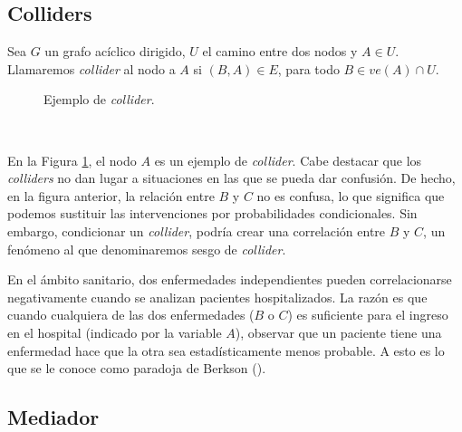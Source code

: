 \documentclass[oneside,openright,titlepage,numbers=noenddot,openany,headinclude,footinclude=true,
cleardoublepage=empty,abstractoff,BCOR=5mm,paper=a4,fontsize=12pt,main=spanish]{scrreprt}
\begin{document}
\subsection{Colliders}

\begin{definition} 
Sea $G$ un grafo acíclico dirigido, $U$ el camino entre dos nodos y $A\in U$. Llamaremos \textit{collider} al nodo a $A$ si $(B,A)\in E$, para todo $B\in ve(A) \cap U$.
\end{definition}

\begin{figure}[h]
\centering
{}
\caption{Ejemplo de \textit{collider}.}
\label{fig:collider}
\end{figure}\

En la Figura \ref{fig:collider}, el nodo $A$ es un ejemplo de \textit{collider}. Cabe destacar que los \textit{colliders} no dan lugar a situaciones en las que se pueda dar confusión. De hecho, en la figura anterior, la relación entre $B$ y $C$ no es confusa, lo que significa que podemos sustituir las intervenciones por probabilidades condicionales. Sin embargo, condicionar un \textit{collider}, podría crear una correlación entre $B$ y $C$, un fenómeno al que denominaremos sesgo de \textit{collider}. 

\begin{example}
En el ámbito sanitario, dos enfermedades independientes pueden correlacionarse negativamente cuando se analizan pacientes hospitalizados. La razón es que cuando cualquiera de las dos enfermedades ($B$ o $C$) es suficiente para el ingreso en el hospital (indicado por la variable $A$), observar que un paciente tiene una enfermedad hace que la otra sea estadísticamente menos probable. A esto es lo que se le conoce como paradoja de Berkson (\cite{berksonparadox2014}).
\end{example}

\subsection{Mediador}
\end{document}
